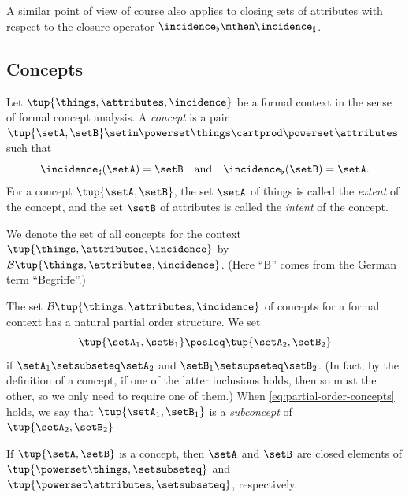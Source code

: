 A similar point of view of course also applies to closing sets of attributes with respect to the closure operator $\incidence_\flat \mthen \incidence_\sharp$.

\subsection{Concepts}

\begin{ctdefinition}\label{def:cfa-concept}
    Let $\tup{\things, \attributes, \incidence}$ be a formal context in the sense of formal concept analysis.
    A \emph{concept} is a pair $\tup{\setA, \setB} \setin \powerset\things \cartprod \powerset\attributes$ such that
    \begin{equation}\label{eq:def-concept-equations}
        \incidence_\sharp(\setA) = \setB \quad \text{and} \quad \incidence_\flat(\setB) = \setA.
    \end{equation}
    For a concept $\tup{\setA, \setB}$, the set $\setA$ of things is called the \emph{extent} of the concept, and the set $\setB$ of attributes is called the \emph{intent} of the concept.

    We denote the set of all concepts for the context $\tup{\things, \attributes, \incidence}$ by $\mathcal{B}\tup{\things, \attributes, \incidence}$.
    (Here ``B'' comes from the German term ``Begriffe''.)
\end{ctdefinition}

The set $\mathcal{B}\tup{\things, \attributes, \incidence}$ of concepts for a formal context has a natural partial order structure.
We set
\begin{equation}\label{eq:partial-order-concepts}
    \tup{\setA_1, \setB_1} \posleq \tup{\setA_2, \setB_2}
\end{equation}
if $\setA_1 \setsubseteq \setA_2$ and $\setB_1 \setsupseteq \setB_2$.
(In fact, by the definition of a concept, if one of the latter inclusions holds, then so must the other, so we only need to require one of them.) When \cref{eq:partial-order-concepts} holds, we say that $\tup{\setA_1, \setB_1}$ is a \emph{subconcept} of $\tup{\setA_2, \setB_2}$

\begin{lemma}\label{lem:extents-and-intents-are-closed}
    If $\tup{\setA, \setB}$ is a concept, then $\setA$ and $\setB$ are closed elements of $\tup{\powerset \things, \setsubseteq}$ and $\tup{\powerset \attributes, \setsubseteq}$, respectively.
\end{lemma}

